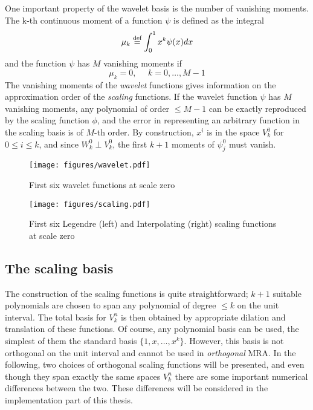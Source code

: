 \noindent
One important property of the wavelet basis is the number of vanishing
moments. The k-th continuous moment of a function $\psi$ is defined as the
integral
\begin{equation}
	\mu_k \stackrel{\text{def}}{\hbox{=}} \int_0^1 x^k\psi(x)dx 	
\end{equation}
and the function $\psi$ has $M$ vanishing moments if 
\[\mu_k = 0,\ \ \ \ \ \ k=0,\dots, M-1 \]
The vanishing moments of the \emph{wavelet} functions gives information on the
approximation order of the \emph{scaling} functions. If the wavelet function
$\psi$ has $M$ vanishing moments, any polynomial of order $\leq M-1$ can be 
exactly reproduced by the scaling function $\phi$, and the error in
representing an arbitrary function in the scaling basis is of $M$-th order. 
By construction, $x^i$ is in the space $V^0_k$ for $0\leq i \leq k$, and since
$W^0_k \perp V^0_k$, the first $k+1$ moments of $\psi^0_j$ must vanish.

\begin{figure}
	\centering
	\texttt{[image: figures/wavelet.pdf]}
	\caption{First six wavelet functions at scale zero}
	\label{fig:waveletbasis}
\end{figure}

\begin{figure}
	\centering
	\texttt{[image: figures/scaling.pdf]}
	\caption{First six Legendre (left) and Interpolating (right) scaling 
		functions at scale zero}
	\label{fig:scalingbasis}
\end{figure}

\subsection{The scaling basis}
The construction of the scaling functions is quite straightforward; $k+1$ 
suitable polynomials are chosen to span any polynomial of degree 
$\leq k$ on the unit interval. The total basis for $V^n_k$ is then 
obtained by appropriate dilation and translation of these functions. Of course, 
any polynomial basis can be used, the simplest of them the standard basis 
$\lbrace1,x,\dots, x^k\rbrace$. However, this basis is not orthogonal on 
the unit interval and cannot be used in \emph{orthogonal} MRA. In the 
following, two choices of orthogonal scaling functions will be presented, and 
even though they span exactly the same spaces $V_k^n$ there are some important
numerical differences between the two. These differences will be considered in
the implementation part of this thesis.\\

